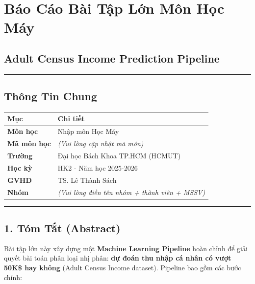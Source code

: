 \documentclass[
]{article}
\author{}
\date{}
\newcounter{none} %
\begin{document}
\section{Báo Cáo Bài Tập Lớn Môn Học
Máy}\label{buxe1o-cuxe1o-buxe0i-tux1eadp-lux1edbn-muxf4n-hux1ecdc-muxe1y}

\subsection{Adult Census Income Prediction
Pipeline}\label{adult-census-income-prediction-pipeline}

\begin{center}\rule{0.5\linewidth}{0.5pt}\end{center}

\subsection{Thông Tin Chung}\label{thuxf4ng-tin-chung}

{\def\LTcaptype{none} %
\begin{longtable}[]{@{}ll@{}}
\toprule\noalign{}
Mục & Chi tiết \\
\midrule\noalign{}
\endhead
\bottomrule\noalign{}
\endlastfoot
\textbf{Môn học} & Nhập môn Học Máy \\
\textbf{Mã môn học} & \emph{(Vui lòng cập nhật mã môn)} \\
\textbf{Trường} & Đại học Bách Khoa TP.HCM (HCMUT) \\
\textbf{Học kỳ} & HK2 - Năm học 2025-2026 \\
\textbf{GVHD} & TS. Lê Thành Sách \\
\textbf{Nhóm} & \emph{(Vui lòng điền tên nhóm + thành viên + MSSV)} \\
\end{longtable}
}

\begin{center}\rule{0.5\linewidth}{0.5pt}\end{center}

\subsection{1. Tóm Tắt (Abstract)}\label{1-tuxf3m-tux1eaft-abstract}

Bài tập lớn này xây dựng một \textbf{Machine Learning Pipeline} hoàn
chỉnh để giải quyết bài toán phân loại nhị phân: \textbf{dự đoán thu
nhập cá nhân có vượt 50K\$ hay không} (Adult Census Income dataset).
Pipeline bao gồm các bước chính:
\end{document}
